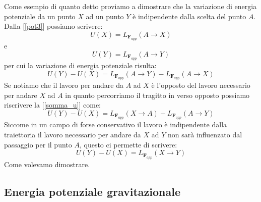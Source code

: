 \documentclass[a4paper,10pt,oneside]{article}
\begin{document}
Come esempio di quanto detto proviamo a dimostrare che la variazione di energia potenziale da un punto $X$ ad un punto $Y$ è indipendente dalla scelta del punto $A$. Dalla [\ref{pot3}] possiamo scrivere:
\begin{equation}
 U(X)=L_{\mathbf{F}_{app}}(A\to X)
\end{equation}
e
\begin{equation}
 U(Y)=L_{\mathbf{F}_{app}}(A\to Y)
\end{equation}
per cui la variazione di energia potenziale risulta:
\begin{equation}\label{somma_u}
 U(Y)-U(X)=L_{\mathbf{F}_{app}}(A\to Y)-L_{\mathbf{F}_{app}}(A\to X)
\end{equation}
Se notiamo che il lavoro per andare da $A$ ad $X$ è l'opposto del lavoro necessario per andare $X$ ad $A$ in quanto percorriamo il tragitto in verso opposto possiamo riscrivere la [\ref{somma_u}] come:
\begin{equation}
 U(Y)-U(X)=L_{\mathbf{F}_{app}}(X\to A)+L_{\mathbf{F}_{app}}(A\to Y)
\end{equation}
 Siccome in un campo di forse conservativo il lavoro è indipendente dalla traiettoria il lavoro necessario per andare da $X$ ad $Y$ non sarà influenzato dal passaggio per il punto $A$, questo ci permette di scrivere:
\begin{equation}
 U(Y)-U(X)=L_{\mathbf{F}_{app}}(X\to Y)
\end{equation}
Come volevamo dimostrare.



\subsection*{Energia potenziale gravitazionale}
\end{document}
